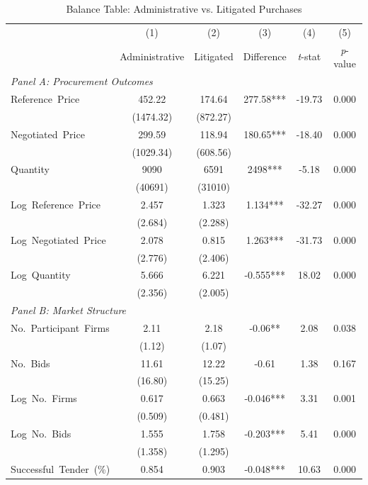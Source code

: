 \begin{table}[ht]
  \centering
  \caption{Balance Table: Administrative vs. Litigated Purchases}
  \label{tab:balance}
  \small
  \begin{threeparttable}
  \begin{tabular}{lccccc}
    \hline\hline
    & (1) & (2) & (3) & (4) & (5) \\
    & Administrative & Litigated & Difference & \textit{t}-stat & \textit{p}-value \\
    \hline
    \multicolumn{6}{l}{\textit{Panel A: Procurement Outcomes}} \\[3pt]
    Reference~Price & 452.22 & 174.64 & 277.58*** & -19.73 & 0.000 \\
    & (1474.32) & (872.27) & & & \\[3pt]
    Negotiated~Price & 299.59 & 118.94 & 180.65*** & -18.40 & 0.000 \\
    & (1029.34) & (608.56) & & & \\[3pt]
    Quantity & 9090 & 6591 & 2498*** & -5.18 & 0.000 \\
    & (40691) & (31010) & & & \\[3pt]
    Log~Reference~Price & 2.457 & 1.323 & 1.134*** & -32.27 & 0.000 \\
    & (2.684) & (2.288) & & & \\[3pt]
    Log~Negotiated~Price & 2.078 & 0.815 & 1.263*** & -31.73 & 0.000 \\
    & (2.776) & (2.406) & & & \\[3pt]
    Log~Quantity & 5.666 & 6.221 & -0.555*** & 18.02 & 0.000 \\
    & (2.356) & (2.005) & & & \\[3pt]
    \hline
    \multicolumn{6}{l}{\textit{Panel B: Market Structure}} \\[3pt]
    No.~Participant~Firms & 2.11 & 2.18 & -0.06** & 2.08 & 0.038 \\
    & (1.12) & (1.07) & & & \\[3pt]
    No.~Bids & 11.61 & 12.22 & -0.61 & 1.38 & 0.167 \\
    & (16.80) & (15.25) & & & \\[3pt]
    Log~No.~Firms & 0.617 & 0.663 & -0.046*** & 3.31 & 0.001 \\
    & (0.509) & (0.481) & & & \\[3pt]
    Log~No.~Bids & 1.555 & 1.758 & -0.203*** & 5.41 & 0.000 \\
    & (1.358) & (1.295) & & & \\[3pt]
    Successful~Tender~(\%) & 0.854 & 0.903 & -0.048*** & 10.63 & 0.000 \\

\end{tabular}
\end{threeparttable}
\end{table}
